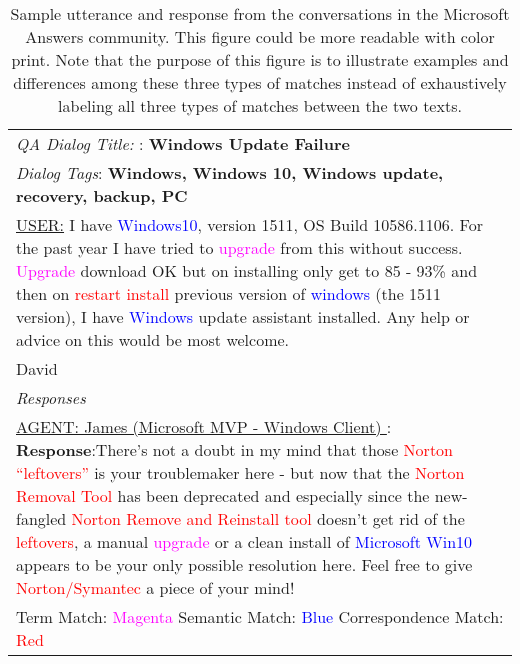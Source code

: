 \begin{table}
	\scriptsize
	\begin{ppl}
		\caption{Sample utterance and response from the conversations in the Microsoft Answers community. This figure could be more readable with color print. Note that the purpose of this figure is to illustrate examples and differences among these three types of matches instead of exhaustively labeling all three types of matches between the two texts.}
		\vspace{-0.1in}
		\begin{tabular}{|p{8.0cm}|}
			\hline
			\multicolumn{1}{|l|}{\emph{QA Dialog Title: }: \textbf{Windows Update Failure }}\\
			\multicolumn{1}{|l|}{\emph{Dialog Tags}: \textbf{Windows, Windows 10, Windows update, recovery, backup, PC}}\\
		    \underline{USER:} I have \textcolor{blue}{Windows10}, version 1511, OS Build 10586.1106. For the past year I have tried to \textcolor{magenta}{upgrade} from this without success. \textcolor{magenta}{Upgrade} download OK but on installing only get to 85 - 93\% and then on \textcolor{red}{restart install} previous version of \textcolor{blue}{windows} (the 1511 version), I have  \textcolor{blue}{Windows} update assistant installed. Any help or advice on this would be most welcome. \\
			David\\
			\hline
			\multicolumn{1}{|l|}{\emph{Responses}} %
			\\
			\hline
			\underline{AGENT: James (Microsoft MVP - Windows Client) }:\newline
			\textbf{Response}:There's not a doubt in my mind that those \textcolor{red}{Norton ``leftovers''} is your troublemaker here - but now that the \textcolor{red}{Norton Removal Tool} has been deprecated and especially since the new-fangled \textcolor{red}{Norton Remove and Reinstall tool} doesn't get rid of the \textcolor{red}{leftovers}, a manual \textcolor{magenta}{upgrade} or a clean install of \textcolor{blue}{Microsoft Win10} appears to be your only possible resolution here. Feel free to give \textcolor{red}{Norton/Symantec} a piece of your mind! \\
			\hline
			Term Match: \textcolor{magenta}{Magenta} \qquad  Semantic Match:  \textcolor{blue}{Blue} \qquad    Correspondence Match:  \textcolor{red}{Red}\\
			\hline
		\end{tabular} \label{tab:qapost_example}
	\end{ppl}
	\vspace{-0.3cm}
\end{table}

